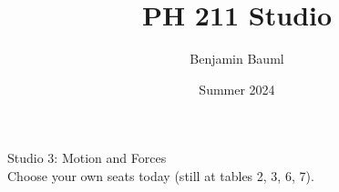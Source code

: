\documentclass[]{article}
\title{PH 211 Studio \Week}
\author{Benjamin Bauml}
\date{Summer 2024}
\begin{document}
\begin{TeacherMargin}

\end{TeacherMargin}
\begin{PresentSpace}
\begin{center}
	\huge Studio 3: Motion and Forces \\
	\vspace{1cm}
	\LARGE Choose your own seats today (still at tables 2, 3, 6, 7).
\end{center}
\begin{comment}{2}
\begin{enumerate}[(A)]
	\item Velocity is acceleration times $t$.
	\vspace{6pt}
	\item Acceleration is velocity times $t$.
	\vspace{15pt}
	\item Acceleration is the derivative of velocity.
	\item Velocity is the derivative of acceleration.
\end{enumerate}
\end{comment}
\end{PresentSpace}
\newpage
\end{document}
